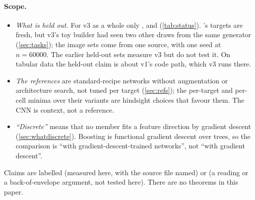 \paragraph{Scope.}
\begin{itemize}
\item \emph{What is held out.} For v3 as a whole only ,  and  (\cref{tab:status}). 's targets are fresh, but v3's toy builder had seen two other draws from the same generator (\cref{sec:tasks}); the image sets come from one source, with one seed at $n=60000$. The earlier held-out sets measure v3 but do not test it. On tabular data the held-out claim is about v1's code path, which v3 runs there.
\item \emph{The references} are standard-recipe networks without augmentation or architecture search, not tuned per target (\cref{sec:refs}); the per-target and per-cell minima over their variants are hindsight choices that favour them. The CNN is context, not a reference.
\item \emph{``Discrete''} means that no member fits a feature direction by gradient descent (\cref{sec:whatdiscrete}). Boosting is functional gradient descent over trees, so the comparison is ``with gradient-descent-trained networks'', not ``with gradient descent''.
\end{itemize}
Claims are labelled  (measured here, with the source file named) or  (a reading or a back-of-envelope argument, not tested here). There are no theorems in this paper.


